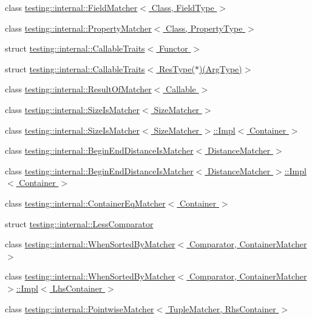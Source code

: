 \begin{DoxyCompactItemize}
\item 
class \hyperlink{classtesting_1_1internal_1_1FieldMatcher}{testing\+::internal\+::\+Field\+Matcher$<$ Class, Field\+Type $>$}
\item 
class \hyperlink{classtesting_1_1internal_1_1PropertyMatcher}{testing\+::internal\+::\+Property\+Matcher$<$ Class, Property\+Type $>$}
\item 
struct \hyperlink{structtesting_1_1internal_1_1CallableTraits}{testing\+::internal\+::\+Callable\+Traits$<$ Functor $>$}
\item 
struct \hyperlink{structtesting_1_1internal_1_1CallableTraits_3_01ResType_07_5_08_07ArgType_08_4}{testing\+::internal\+::\+Callable\+Traits$<$ Res\+Type($\ast$)(\+Arg\+Type)$>$}
\item 
class \hyperlink{classtesting_1_1internal_1_1ResultOfMatcher}{testing\+::internal\+::\+Result\+Of\+Matcher$<$ Callable $>$}
\item 
class \hyperlink{classtesting_1_1internal_1_1SizeIsMatcher}{testing\+::internal\+::\+Size\+Is\+Matcher$<$ Size\+Matcher $>$}
\item 
class \hyperlink{classtesting_1_1internal_1_1SizeIsMatcher_1_1Impl}{testing\+::internal\+::\+Size\+Is\+Matcher$<$ Size\+Matcher $>$\+::\+Impl$<$ Container $>$}
\item 
class \hyperlink{classtesting_1_1internal_1_1BeginEndDistanceIsMatcher}{testing\+::internal\+::\+Begin\+End\+Distance\+Is\+Matcher$<$ Distance\+Matcher $>$}
\item 
class \hyperlink{classtesting_1_1internal_1_1BeginEndDistanceIsMatcher_1_1Impl}{testing\+::internal\+::\+Begin\+End\+Distance\+Is\+Matcher$<$ Distance\+Matcher $>$\+::\+Impl$<$ Container $>$}
\item 
class \hyperlink{classtesting_1_1internal_1_1ContainerEqMatcher}{testing\+::internal\+::\+Container\+Eq\+Matcher$<$ Container $>$}
\item 
struct \hyperlink{structtesting_1_1internal_1_1LessComparator}{testing\+::internal\+::\+Less\+Comparator}
\item 
class \hyperlink{classtesting_1_1internal_1_1WhenSortedByMatcher}{testing\+::internal\+::\+When\+Sorted\+By\+Matcher$<$ Comparator, Container\+Matcher $>$}
\item 
class \hyperlink{classtesting_1_1internal_1_1WhenSortedByMatcher_1_1Impl}{testing\+::internal\+::\+When\+Sorted\+By\+Matcher$<$ Comparator, Container\+Matcher $>$\+::\+Impl$<$ Lhs\+Container $>$}
\item 
class \hyperlink{classtesting_1_1internal_1_1PointwiseMatcher}{testing\+::internal\+::\+Pointwise\+Matcher$<$ Tuple\+Matcher, Rhs\+Container $>$}

\end{DoxyCompactItemize}
